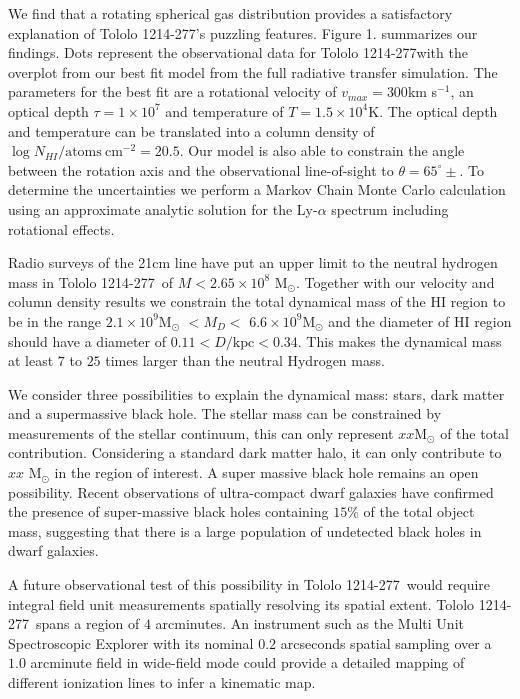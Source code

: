 \documentclass[a4paper, usenatbib, 12pt]{article}
\newcommand{\tol}{Tololo 1214-277}
\newcommand{\kms}{km s$^{-1}$}
\begin{document}
{We find that a rotating spherical gas distribution provides a
satisfactory explanation of \tol's puzzling features.  
Figure 1. summarizes our findings.
Dots represent the observational data for \tol with the
overplot from our best fit model from the full radiative transfer
simulation.   
The parameters for the best fit are a rotational velocity of
$v_{max}=300$\kms, an optical depth $\tau=1\times10^7$ and temperature
of $T=1.5\times 10^{4}$K.
The optical depth and temperature can be translated into a column
density of $\log N_{HI} / \mathrm{atoms\ cm}^{-2} =
  20.5$.   
Our model is also able to constrain the angle
between the rotation axis and the observational line-of-sight to
$\theta=65^{\circ}\pm$. 
To determine the uncertainties we perform a Markov Chain Monte
Carlo calculation using an approximate analytic solution for the
Ly-$\alpha$ spectrum including rotational effects.


Radio surveys of the 21cm line have put an upper limit to the neutral
hydrogen mass in \tol\ of $M<2.65\times 10^{8}$ M$_{\odot}$. 
Together with our velocity and column density results we constrain the
total dynamical mass of the HI region to be in the range $2.1\times
10^{9}$M$_{\odot}$ $<M_D<$  $6.6\times 10^{9}$M$_{\odot}$ and the
diameter of HI region should have a diameter of $0.11 <
D/\mathrm{kpc}<0.34$.  
This makes the dynamical mass  at least $7$ to $25$ times larger than
the neutral Hydrogen mass.  

We consider three possibilities to explain the dynamical 
mass: stars, dark matter and a supermassive black hole. 
The stellar mass can be constrained by measurements of the 
stellar continuum, this can only represent $xx$M$_{\odot}$ of the total
contribution. 
Considering a standard dark matter halo, it can only contribute to
$xx$ M$_{\odot}$ in the region of interest. 
A super massive black hole remains an open possibility. 
Recent observations of ultra-compact dwarf galaxies
\cite{Seth2014} have confirmed the presence of super-massive black
holes containing $15\%$ of the total object mass, suggesting that
there is a large population of undetected black holes in dwarf
galaxies.  

A future observational test of this possibility in \tol\ would require
integral field unit measurements spatially resolving its spatial
extent. 
\tol\ spans a region of $4$ arcminutes. 
An instrument such as the Multi Unit Spectroscopic Explorer with its
nominal $0.2$ arcseconds spatial sampling over a $1.0$ arcminute field
in wide-field mode could provide a detailed mapping of different
ionization lines to infer a kinematic map.

}
\end{document}
